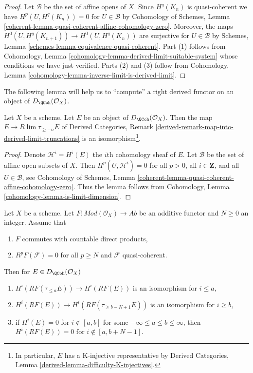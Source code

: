 \begin{proof}
Let $\mathcal{B}$ be the set of affine opens of $X$.
Since $H^q(K_n)$ is quasi-coherent we have $H^p(U, H^q(K_n)) = 0$
for $U \in \mathcal{B}$ by Cohomology of Schemes, Lemma
\ref{coherent-lemma-quasi-coherent-affine-cohomology-zero}.
Moreover, the maps $H^0(U, H^q(K_{n + 1})) \to H^0(U, H^q(K_n))$
are surjective for $U \in \mathcal{B}$ by
Schemes, Lemma \ref{schemes-lemma-equivalence-quasi-coherent}.
Part (1) follows from Cohomology, Lemma
\ref{cohomology-lemma-derived-limit-suitable-system}
whose conditions we have just verified.
Parts (2) and (3) follow from
Cohomology, Lemma \ref{cohomology-lemma-inverse-limit-is-derived-limit}.
\end{proof}

\noindent
The following lemma will help us to ``compute'' a right derived functor
on an object of $D_\QCoh(\mathcal{O}_X)$.

\begin{lemma}
\label{lemma-nice-K-injective}
Let $X$ be a scheme. Let $E$ be an object of
$D_\QCoh(\mathcal{O}_X)$. Then the map $E \to R\lim \tau_{\geq -n}E$ of
Derived Categories, Remark
\ref{derived-remark-map-into-derived-limit-truncations}
is an isomorphism\footnote{In particular,
$E$ has a K-injective representative by
Derived Categories, Lemma \ref{derived-lemma-difficulty-K-injectives}.}.
\end{lemma}

\begin{proof}
Denote $\mathcal{H}^i = H^i(E)$ the $i$th cohomology sheaf of $E$.
Let $\mathcal{B}$ be the set of affine open subsets of $X$. Then
$H^p(U, \mathcal{H}^i) = 0$ for all $p > 0$, all $i \in \mathbf{Z}$,
and all $U \in \mathcal{B}$, see
Cohomology of Schemes, Lemma
\ref{coherent-lemma-quasi-coherent-affine-cohomology-zero}.
Thus the lemma follows from
Cohomology, Lemma \ref{cohomology-lemma-is-limit-dimension}.
\end{proof}

\begin{lemma}
\label{lemma-application-nice-K-injective}
Let $X$ be a scheme. Let $F : \textit{Mod}(\mathcal{O}_X) \to \textit{Ab}$
be an additive functor and $N \geq 0$ an integer. Assume that
\begin{enumerate}
\item $F$ commutes with countable direct products,
\item $R^pF(\mathcal{F}) = 0$ for all $p \geq N$ and $\mathcal{F}$
quasi-coherent.
\end{enumerate}
Then for $E \in D_\QCoh(\mathcal{O}_X)$
\begin{enumerate}
\item $H^i(RF(\tau_{\leq a}E)) \to H^i(RF(E))$ is an isomorphism
for $i \leq a$,
\item $H^i(RF(E)) \to H^i(RF(\tau_{\geq b - N + 1}E))$ is an isomorphism
for $i \geq b$,
\item if $H^i(E) = 0$ for $i \not \in [a, b]$ for some
$-\infty \leq a \leq b \leq \infty$, then $H^i(RF(E)) = 0$
for $i \not \in [a, b + N - 1]$.
\end{enumerate}
\end{lemma}

